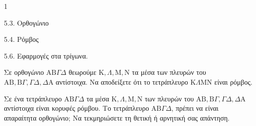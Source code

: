 \begin{ylh}{1}
    \item 5.3. Ορθογώνιο
    \item 5.4. Ρόμβος
    \item 5.6. Εφαρμογές στα τρίγωνα.
\end{ylh}
\begin{alist}
    \item Σε ορθογώνιο $\mathrm{A}\mathrm{B}\Gamma\Delta$ θεωρούμε $\mathrm{K}, \Lambda, \mathrm{M}, \mathrm{N}$ τα μέσα των πλευρών του $\mathrm{A}\mathrm{B}, \mathrm{B}\Gamma, \Gamma\Delta, \Delta\mathrm{A}$ αντίστοιχα. Να αποδείξετε ότι το τετράπλευρο $\mathrm{K}\Lambda\mathrm{M}\mathrm{N}$ είναι ρόμβος. 
    \item Σε ένα τετράπλευρο $\mathrm{A}\mathrm{B}\Gamma\Delta$ τα μέσα $\mathrm{K}, \Lambda, \mathrm{M}, \mathrm{N}$ των πλευρών του $\mathrm{A}\mathrm{B}, \mathrm{B}\Gamma, \Gamma\Delta, \Delta\mathrm{A}$ αντίστοιχα είναι κορυφές ρόμβου. Το τετράπλευρο $\mathrm{A}\mathrm{B}\Gamma\Delta$, πρέπει να είναι απαραίτητα ορθογώνιο; Να τεκμηριώσετε τη θετική ή αρνητική σας απάντηση. 
\end{alist}
